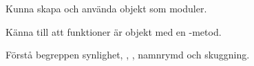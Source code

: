 
\item Kunna skapa och använda objekt som moduler.
\item Känna till att funktioner är objekt med en -metod.
\item Förstå begreppen synlighet, , , namnrymd och skuggning.
\item {}


